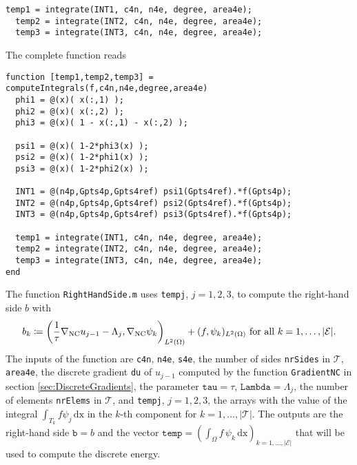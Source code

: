 \begin{lstlisting}[frame=single,numbers=none]
  temp1 = integrate(INT1, c4n, n4e, degree, area4e);
  temp2 = integrate(INT2, c4n, n4e, degree, area4e);
  temp3 = integrate(INT3, c4n, n4e, degree, area4e);
\end{lstlisting}
The complete function reads

\begin{lstlisting}[frame=single,numbers=none]
function [temp1,temp2,temp3] = computeIntegrals(f,c4n,n4e,degree,area4e)
  phi1 = @(x)( x(:,1) );
  phi2 = @(x)( x(:,2) );
  phi3 = @(x)( 1 - x(:,1) - x(:,2) );
  
  psi1 = @(x)( 1-2*phi3(x) );
  psi2 = @(x)( 1-2*phi1(x) );
  psi3 = @(x)( 1-2*phi2(x) );
  
  INT1 = @(n4p,Gpts4p,Gpts4ref) psi1(Gpts4ref).*f(Gpts4p);
  INT2 = @(n4p,Gpts4p,Gpts4ref) psi2(Gpts4ref).*f(Gpts4p);        
  INT3 = @(n4p,Gpts4p,Gpts4ref) psi3(Gpts4ref).*f(Gpts4p);
  
  temp1 = integrate(INT1, c4n, n4e, degree, area4e);
  temp2 = integrate(INT2, c4n, n4e, degree, area4e);
  temp3 = integrate(INT3, c4n, n4e, degree, area4e);
end
\end{lstlisting}

The function \texttt{RightHandSide.m} uses \texttt{tempj}, $j=1,2,3$, to compute the right-hand
side $b$ with
$$
b_k\coloneqq
\left(
\frac{1}{\tau}
\nabla_{\textup{NC}}u_{j-1}-\Lambda_j,\nabla_{\textup{NC}}\psi_k
\right)_{L^2(\Omega)}+(f,\psi_k)_{L^2(\Omega)} \text{ for all } k=1,\dots,|\mathcal E|.
$$
The inputs of the function are \texttt{c4n},
\texttt{n4e}, \texttt{s4e}, the number of sides \texttt{nrSides} in $\mathcal T$,
\texttt{area4e}, the discrete gradient \texttt{du} of $u_{j-1}$ computed by the function
\texttt{GradientNC} in section \ref{sec:DiscreteGradients}, the parameter $\texttt{tau}=\tau$,
$\texttt{Lambda}=\Lambda_j$, the number of elements \texttt{nrElems} in $\mathcal T$, and 
\texttt{tempj}, $j=1,2,3$, the arrays with the value of the integral
$
\int_{T_k} f\psi_j\,\mathrm{dx} 
$
in the $k$-th component for $k=1,\dots,|\mathcal T|$.
The outputs are the right-hand side $\texttt{b}=b$ and the vector 
$\texttt{temp}=\left( \int_\Omega f\, \psi_k \, \mathrm{dx} \right)_{k=1,\dots,|\mathcal E|}$ 
that will be used to compute the discrete energy.

